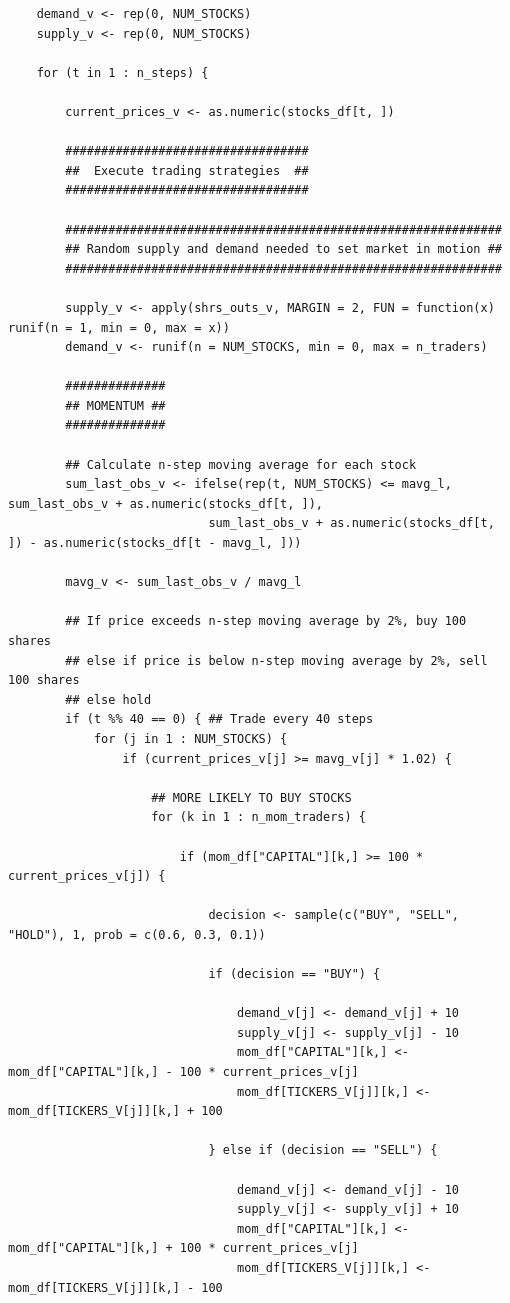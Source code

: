 \documentclass[12pt]{article}
\begin{document}
\begin{lstlisting}
	demand_v <- rep(0, NUM_STOCKS)
	supply_v <- rep(0, NUM_STOCKS)

	for (t in 1 : n_steps) {
		
		current_prices_v <- as.numeric(stocks_df[t, ])
		
		##################################
		##  Execute trading strategies  ##
		##################################
	
		#############################################################
		## Random supply and demand needed to set market in motion ##
		#############################################################

		supply_v <- apply(shrs_outs_v, MARGIN = 2, FUN = function(x) runif(n = 1, min = 0, max = x))
		demand_v <- runif(n = NUM_STOCKS, min = 0, max = n_traders)
	
		##############
		## MOMENTUM ##
		##############
		
		## Calculate n-step moving average for each stock
		sum_last_obs_v <- ifelse(rep(t, NUM_STOCKS) <= mavg_l, sum_last_obs_v + as.numeric(stocks_df[t, ]),
					        sum_last_obs_v + as.numeric(stocks_df[t, ]) - as.numeric(stocks_df[t - mavg_l, ]))
		
		mavg_v <- sum_last_obs_v / mavg_l 

		## If price exceeds n-step moving average by 2%, buy 100 shares
		## else if price is below n-step moving average by 2%, sell 100 shares
		## else hold 
		if (t %% 40 == 0) { ## Trade every 40 steps
			for (j in 1 : NUM_STOCKS) {
				if (current_prices_v[j] >= mavg_v[j] * 1.02) {

					## MORE LIKELY TO BUY STOCKS	
					for (k in 1 : n_mom_traders) {

						if (mom_df["CAPITAL"][k,] >= 100 * current_prices_v[j]) {

							decision <- sample(c("BUY", "SELL", "HOLD"), 1, prob = c(0.6, 0.3, 0.1))

							if (decision == "BUY") {

								demand_v[j] <- demand_v[j] + 10
								supply_v[j] <- supply_v[j] - 10
								mom_df["CAPITAL"][k,] <- mom_df["CAPITAL"][k,] - 100 * current_prices_v[j]
								mom_df[TICKERS_V[j]][k,] <- mom_df[TICKERS_V[j]][k,] + 100

							} else if (decision == "SELL") {

								demand_v[j] <- demand_v[j] - 10
								supply_v[j] <- supply_v[j] + 10
								mom_df["CAPITAL"][k,] <- mom_df["CAPITAL"][k,] + 100 * current_prices_v[j]
								mom_df[TICKERS_V[j]][k,] <- mom_df[TICKERS_V[j]][k,] - 100


\end{lstlisting}
\end{document}
